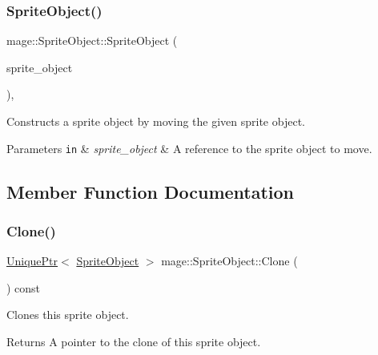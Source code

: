\subsubsection{\texorpdfstring{Sprite\+Object()}{SpriteObject()}\hspace{0.1cm}{\footnotesize\ttfamily [3/3]}}
{\footnotesize\ttfamily mage\+::\+Sprite\+Object\+::\+Sprite\+Object (\begin{DoxyParamCaption}\item[{\hyperlink{classmage_1_1_sprite_object}{Sprite\+Object} \&\&}]{sprite\+\_\+object }\end{DoxyParamCaption})\hspace{0.3cm}{\ttfamily [protected]}, {\ttfamily [default]}}

Constructs a sprite object by moving the given sprite object.


\begin{DoxyParams}[1]{Parameters}
\mbox{\tt in}  & {\em sprite\+\_\+object} & A reference to the sprite object to move. \\
\hline
\end{DoxyParams}


\subsection{Member Function Documentation}
\hypertarget{classmage_1_1_sprite_object_a761528ee815cbac83f9a490e07752e5c}{}\label{classmage_1_1_sprite_object_a761528ee815cbac83f9a490e07752e5c} 
\subsubsection{\texorpdfstring{Clone()}{Clone()}}
{\footnotesize\ttfamily \hyperlink{namespacemage_a8c307fbcc33bce9b7f2aa4c26c3b95cf}{Unique\+Ptr}$<$ \hyperlink{classmage_1_1_sprite_object}{Sprite\+Object} $>$ mage\+::\+Sprite\+Object\+::\+Clone (\begin{DoxyParamCaption}{ }\end{DoxyParamCaption}) const}

Clones this sprite object.

\begin{DoxyReturn}{Returns}
A pointer to the clone of this sprite object. 
\end{DoxyReturn}
\hypertarget{classmage_1_1_sprite_object_acbbe3d5894e5a43df411b7e5785ae174}{}\label{classmage_1_1_sprite_object_acbbe3d5894e5a43df411b7e5785ae174} 
